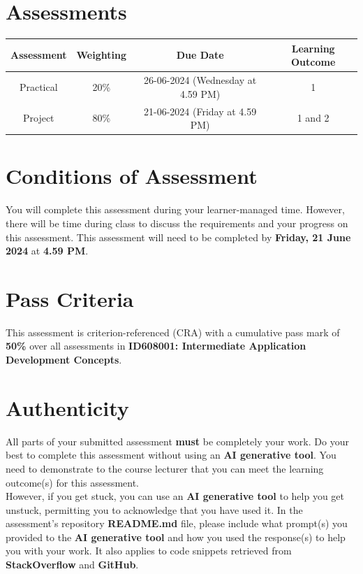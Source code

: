 \documentclass{article}
\begin{document}
\section*{Assessments}
\renewcommand{\arraystretch}{1.5}
\begin{tabular}{|c|c|c|c|}
	\hline
	\textbf{Assessment}                                 & \textbf{Weighting} & \textbf{Due Date}            & \textbf{Learning Outcome} \\ \hline
	\small Practical & \small 20\%        & \small 26-06-2024 (Wednesday at 4.59 PM)   & \small 1                   \\ \hline
	\small Project                 & \small 80\%        & \small 21-06-2024 (Friday at 4.59 PM) \small  & \small 1 and 2                   \\ \hline
\end{tabular}

\section*{Conditions of Assessment}
You will complete this assessment during your learner-managed time. However, there will be time during class to discuss the requirements and your progress on this assessment. This assessment will need to be completed by \textbf{Friday, 21 June 2024} at \textbf{4.59 PM}. 

\section*{Pass Criteria}
This assessment is criterion-referenced (CRA) with a cumulative pass mark of \textbf{50\%} over all assessments in \textbf{ID608001: Intermediate Application Development Concepts}.

\section*{Authenticity}
All parts of your submitted assessment \textbf{must} be completely your work. Do your best to complete this assessment without using an \textbf{AI generative tool}. You need to demonstrate to the course lecturer that you can meet the learning outcome(s) for this assessment. \\
 
 However, if you get stuck, you can use an \textbf{AI generative tool} to help you get unstuck, permitting you to acknowledge that you have used it. In the assessment's repository \textbf{README.md} file, please include what prompt(s) you provided to the \textbf{AI generative tool} and how you used the response(s) to help you with your work. It also applies to code snippets retrieved from \textbf{StackOverflow} and \textbf{GitHub}. \\
 
\end{document}
